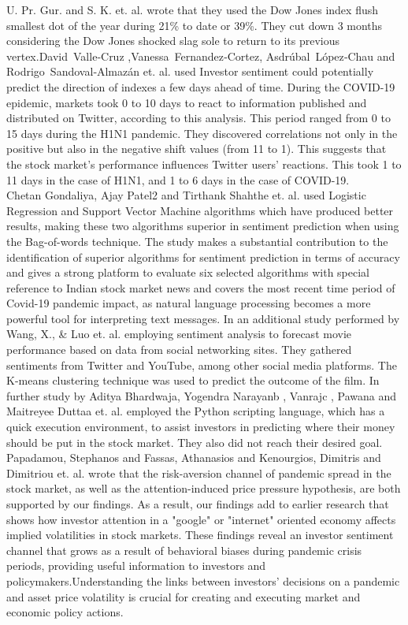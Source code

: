 U. Pr. Gur. and S. K. et. al. \cite{gururaj2019stock} wrote that they used the Dow Jones index flush smallest dot of the year during 21\% to date or 39\%. They cut down 3 months considering the Dow Jones shocked slag sole to return to its previous vertex.David Valle‑Cruz ,Vanessa Fernandez‑Cortez, Asdrúbal López‑Chau and Rodrigo Sandoval‑Almazán et. al.\cite{valle2021does} used Investor sentiment could potentially predict the direction of indexes a few days ahead of time. During the COVID-19 epidemic, markets took 0 to 10 days to react to information published and distributed on Twitter, according to this analysis. This period ranged from 0 to 15 days during the H1N1 pandemic.  They discovered correlations not only in the positive but also in the negative shift values (from 11 to 1). This suggests that the stock market's performance influences Twitter users' reactions. This took 1 to 11 days in the case of H1N1, and 1 to 6 days in the case of COVID-19.\\

Chetan Gondaliya, Ajay Patel2 and Tirthank Shahthe \cite{gondaliya2021sentiment} et. al. used Logistic Regression and Support Vector Machine algorithms which have produced better results, making these two algorithms superior in sentiment prediction when using the Bag-of-words technique. The study makes a substantial contribution to the identification of superior algorithms for sentiment prediction in terms of accuracy and gives a strong platform to evaluate six selected algorithms with special reference to Indian stock market news and covers the most recent time period of Covid-19 pandemic impact, as natural language processing becomes a more powerful tool for interpreting text messages. In an additional study performed by Wang, X., \& Luo \cite{wang2013sentimental} et. al. employing sentiment analysis to forecast movie performance based on data from social networking sites. They gathered sentiments from Twitter and YouTube, among other social media platforms. The K-means clustering technique was used to predict the outcome of the film. In further study by Aditya Bhardwaja, Yogendra Narayanb , Vanrajc , Pawana and Maitreyee Duttaa et. al.\cite{bhardwaj2015sentiment} employed the Python scripting language, which has a quick execution environment, to assist investors in predicting where their money should be put in the stock market. They also did not reach their desired goal.\\

Papadamou, Stephanos and Fassas, Athanasios and Kenourgios, Dimitris and Dimitriou et. al. \cite{papadamou2020direct} wrote that the risk-aversion channel of pandemic spread in the stock market, as well as the attention-induced price pressure hypothesis, are both supported by our findings. As a result, our findings add to earlier research that shows how investor attention in a "google" or "internet" oriented economy affects implied volatilities in stock markets. These findings reveal an investor sentiment channel that grows as a result of behavioral biases during pandemic crisis periods, providing useful information to investors and policymakers.Understanding the links between investors' decisions on a pandemic and asset price volatility is crucial for creating and executing market and economic policy actions.


